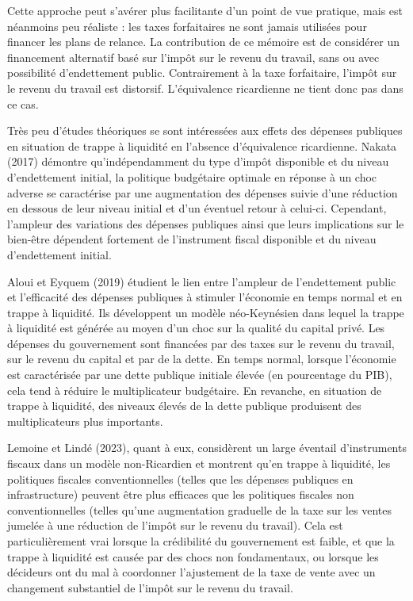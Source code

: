 \documentclass[12pt,letterpaper]{article}
\begin{document}
Cette approche peut s’avérer plus facilitante d’un point de vue pratique, mais est néanmoins peu réaliste : les taxes forfaitaires ne sont jamais utilisées pour financer les plans de relance. La contribution de ce mémoire est de considérer un financement alternatif basé sur l’impôt sur le revenu du travail, sans ou avec possibilité d’endettement public. Contrairement à la taxe forfaitaire, l’impôt sur le revenu du travail est distorsif. L’équivalence ricardienne ne tient donc pas dans ce cas.

Très peu d’études théoriques se sont intéressées aux effets des dépenses publiques en situation de trappe à liquidité en l’absence d’équivalence ricardienne. Nakata (2017) démontre qu’indépendamment du type d'impôt disponible et du niveau d'endettement initial, la politique budgétaire optimale en réponse à un choc adverse se caractérise par une augmentation des dépenses suivie d'une réduction en dessous de leur niveau initial et d'un éventuel retour à celui-ci. Cependant, l'ampleur des variations des dépenses publiques ainsi que leurs implications sur le bien-être dépendent fortement de l'instrument fiscal disponible et du niveau d'endettement initial.

Aloui et Eyquem (2019) étudient le lien entre l'ampleur de l'endettement public et l'efficacité des dépenses publiques à stimuler l’économie en temps normal et en trappe à liquidité. Ils développent un modèle néo-Keynésien dans lequel la trappe à liquidité est générée au moyen d’un choc sur la qualité du capital privé. Les dépenses du gouvernement sont financées par des taxes sur le revenu du travail, sur le revenu du capital et par de la dette. En temps normal, lorsque l’économie est caractérisée par une dette publique initiale élevée (en pourcentage du PIB), cela tend à réduire le multiplicateur budgétaire. En revanche, en situation de trappe à liquidité, des niveaux élevés de la dette publique produisent des multiplicateurs plus importants.

Lemoine et Lindé (2023), quant à eux, considèrent un large éventail d’instruments fiscaux dans un modèle non-Ricardien et montrent qu’en trappe à liquidité, les politiques fiscales conventionnelles (telles que les dépenses publiques en infrastructure) peuvent être plus efficaces que les politiques fiscales non conventionnelles (telles qu’une augmentation graduelle de la taxe sur les ventes jumelée à une réduction de l'impôt sur le revenu du travail). Cela est particulièrement vrai lorsque la crédibilité du gouvernement est faible, et que la trappe à liquidité est causée par des chocs non fondamentaux, ou lorsque les décideurs ont du mal à coordonner l'ajustement de la taxe de vente avec un changement substantiel de l'impôt sur le revenu du travail.
\end{document}
